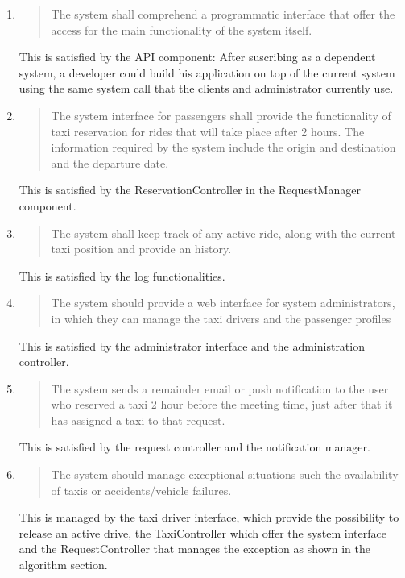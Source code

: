 \documentclass[11pt, a4paper,titlepage]{article}
\begin{document}
\begin{enumerate}
			\item
			\begin{quotation}		
			 The system shall comprehend a programmatic interface that offer the access for the main functionality of the system itself.
			\end{quotation}
			This is satisfied by the API component: After suscribing as a dependent system, a developer could build his application on top of the current system using the same system call that the clients and administrator currently use.
			\item
			\begin{quotation}	
		 The system interface for passengers shall provide the functionality of taxi reservation for rides that will take place after 2 hours. The information required by the system include the origin and destination and the departure date.
			\end{quotation}
			This is satisfied by the ReservationController in the RequestManager component.
			\item
			\begin{quotation}
		 The system shall keep track of any active ride, along with the current taxi position and provide an history.
			\end{quotation}
			This is satisfied by the log functionalities.
			\item
			\begin{quotation}
		 The system should provide a web interface for system administrators, in which they can manage the taxi drivers and the passenger profiles
			\end{quotation}
			This is satisfied by the administrator interface and the administration controller.
			\item
			\begin{quotation}
		The system sends a remainder email or push notification to the user who reserved a taxi 2 hour before the meeting time, just after that it has assigned a taxi to that request.
			\end{quotation}
			This is satisfied by the request controller and the notification manager.
			\item
			\begin{quotation}
		The system should manage exceptional situations such the availability of taxis or accidents/vehicle failures.
			\end{quotation}
			This is managed by the taxi driver interface, which provide the possibility to release an active drive, the TaxiController which offer the system interface and the RequestController that manages the exception as shown in the algorithm section.
		\end{enumerate}
		
\end{document}
